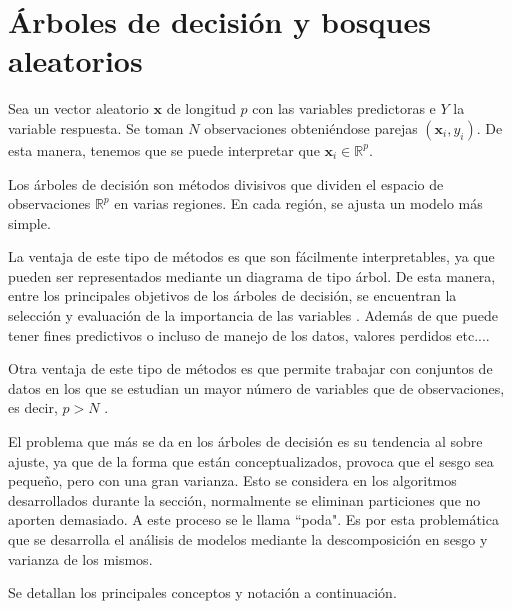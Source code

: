 \newpage
\section{ Árboles de decisión y bosques aleatorios}

\noindent Sea un vector aleatorio $\textbf{x}$ de longitud $p$ con las variables predictoras e $Y$ la variable respuesta. Se toman $N$ observaciones obteniéndose parejas $(\textbf{x}_i,y_i)$. De esta manera, tenemos que se puede interpretar que $\mathbf{x}_i\in\mathbb{R}^p$.

\noindent Los árboles de decisión son métodos divisivos que dividen el espacio de observaciones $\mathbb{R}^p$ en varias regiones. En cada región, se ajusta un modelo más simple.

\noindent La ventaja de este tipo de métodos es que son fácilmente interpretables, ya que pueden ser representados mediante un diagrama de tipo árbol. De esta manera, entre los principales objetivos de los árboles de decisión, se encuentran la selección y evaluación de la importancia de las variables \cite{Brown 2004,Song 2015}. Además de que puede tener fines predictivos o incluso de manejo de los datos, valores perdidos etc...\cite{Nerini 2007}.

\noindent Otra ventaja de este tipo de métodos es que permite trabajar con conjuntos de datos en los que se estudian un mayor número de variables que de observaciones, es decir, $p > N$ \cite{Diaz 2006}. 

\noindent El problema que más se da en los árboles de decisión es su tendencia al sobre ajuste, ya que de la forma que están conceptualizados, provoca que el sesgo sea pequeño, pero con una gran varianza. Esto se considera en los algoritmos desarrollados durante la sección, normalmente se eliminan particiones que no aporten demasiado. A este proceso se le llama ``poda". Es por esta problemática que se desarrolla el análisis de modelos mediante la descomposición en sesgo y varianza de los mismos. 

\noindent Se detallan los principales conceptos y notación a continuación. 

